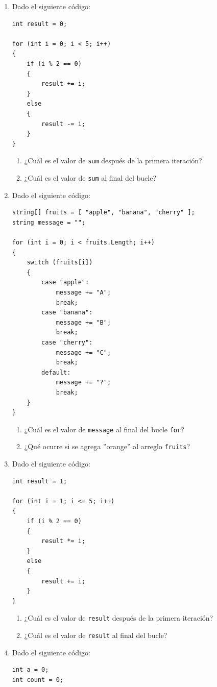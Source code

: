\begin{enumerate}
\item Dado el siguiente código:
\begin{lstlisting}
int result = 0;

for (int i = 0; i < 5; i++)
{
    if (i % 2 == 0)
    {
        result += i;
    }
    else
    {
        result -= i;
    }
}
\end{lstlisting}
\begin{enumerate}
    \item ¿Cuál es el valor de \texttt{sum} después de la primera iteración?
    \item ¿Cuál es el valor de \texttt{sum} al final del bucle?
\end{enumerate}

\item Dado el siguiente código:
\begin{lstlisting}
string[] fruits = [ "apple", "banana", "cherry" ];
string message = "";

for (int i = 0; i < fruits.Length; i++)
{
    switch (fruits[i])
    {
        case "apple":
            message += "A";
            break;
        case "banana":
            message += "B";
            break;
        case "cherry":
            message += "C";
            break;
        default:
            message += "?";
            break;
    }
}
\end{lstlisting}
\begin{enumerate}
    \item ¿Cuál es el valor de \texttt{message} al final del bucle \texttt{for}?
    \item ¿Qué ocurre si se agrega ''orange'' al arreglo \texttt{fruits}?
\end{enumerate}

\item Dado el siguiente código:
\begin{lstlisting}
int result = 1;

for (int i = 1; i <= 5; i++)
{
    if (i % 2 == 0)
    {
        result *= i;
    }
    else
    {
        result += i;
    }
}
\end{lstlisting}
\begin{enumerate}
    \item ¿Cuál es el valor de \texttt{result} después de la primera iteración?
    \item ¿Cuál es el valor de \texttt{result} al final del bucle?
\end{enumerate}

\item Dado el siguiente código:
\begin{lstlisting}
int a = 0;
int count = 0;


\end{lstlisting}
\end{enumerate}
